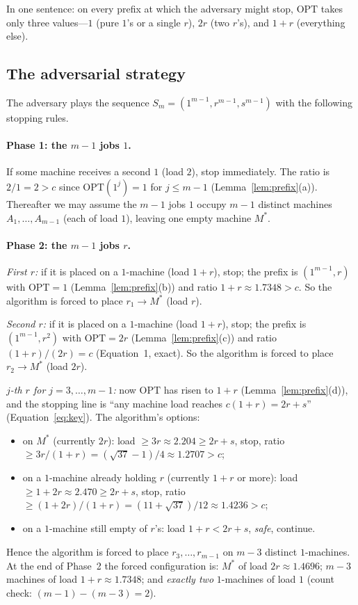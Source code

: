 \documentclass[11pt]{article}
\theoremstyle{definition}
\newcommand{\opt}{\mathrm{OPT}}
\begin{document}
In one sentence: on every prefix at which the adversary might stop, $\opt$
takes only three values---$1$ (pure $1$'s or a single $r$), $2r$ (two
$r$'s), and $1+r$ (everything else).

\subsection{The adversarial strategy}

The adversary plays the sequence
$S_{m}=(1^{m-1},r^{m-1},s^{m-1})$ with the following stopping rules.

\paragraph{Phase 1: the $m-1$ jobs $1$.}
If some machine receives a second $1$ (load $2$), stop immediately. The
ratio is $2/1=2>c$ since $\opt(1^{j})=1$ for $j\le m-1$ (Lemma~\ref{lem:prefix}(a)).
Thereafter we may assume the $m-1$ jobs $1$ occupy $m-1$ distinct machines
$A_{1},\dots,A_{m-1}$ (each of load $1$), leaving one empty machine $M^{*}$.

\paragraph{Phase 2: the $m-1$ jobs $r$.}
\emph{First $r$:} if it is placed on a $1$-machine (load $1+r$), stop; the
prefix is $(1^{m-1},r)$ with $\opt=1$ (Lemma~\ref{lem:prefix}(b)) and ratio
$1+r\approx1.7348>c$. So the algorithm is forced to place $r_{1}\to M^{*}$
(load $r$).

\emph{Second $r$:} if it is placed on a $1$-machine (load $1+r$), stop; the
prefix is $(1^{m-1},r^{2})$ with $\opt=2r$ (Lemma~\ref{lem:prefix}(c)) and
ratio $(1+r)/(2r)=c$ (Equation~1, exact). So the algorithm is forced to
place $r_{2}\to M^{*}$ (load $2r$).

\emph{$j$-th $r$ for $j=3,\dots,m-1$:} now $\opt$ has risen to $1+r$
(Lemma~\ref{lem:prefix}(d)), and the stopping line is ``any machine load
reaches $c(1+r)=2r+s$'' (Equation~\eqref{eq:key}). The algorithm's options:
\begin{itemize}
\item on $M^{*}$ (currently $2r$): load $\ge3r\approx2.204\ge2r+s$,
stop, ratio $\ge3r/(1+r)=(\sqrt{37}-1)/4\approx1.2707>c$;
\item on a $1$-machine already holding $r$ (currently $1+r$ or more): load
$\ge1+2r\approx2.470\ge2r+s$, stop, ratio
$\ge(1+2r)/(1+r)=(11+\sqrt{37})/12\approx1.4236>c$;
\item on a $1$-machine still empty of $r$'s: load $1+r<2r+s$, \emph{safe},
continue.
\end{itemize}
Hence the algorithm is forced to place $r_{3},\dots,r_{m-1}$ on $m-3$
distinct $1$-machines. At the end of Phase~2 the forced configuration is:
$M^{*}$ of load $2r\approx1.4696$; $m-3$ machines of load $1+r\approx1.7348$;
and \emph{exactly two} $1$-machines of load $1$ (count check:
$(m-1)-(m-3)=2$).
\end{document}
